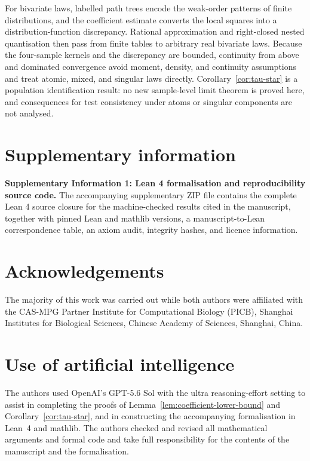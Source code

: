 \documentclass[pdflatex,sn-mathphys-num]{sn-jnl}
\theoremstyle{thmstyleone}
\begin{document}
For bivariate laws, labelled path trees encode the weak-order patterns of
finite distributions, and the coefficient estimate converts the local
squares into a distribution-function discrepancy.  Rational approximation
and right-closed nested quantisation then pass from finite tables to arbitrary
real bivariate laws.  Because the four-sample kernels and the discrepancy are
bounded, continuity from above and dominated convergence avoid moment,
density, and continuity assumptions and treat atomic, mixed, and singular
laws directly.  Corollary~\ref{cor:tau-star} is a population identification
result: no new sample-level limit theorem is proved here, and consequences for
test consistency under atoms or singular components are not analysed.

\backmatter

\section*{Supplementary information}

\textbf{Supplementary Information 1: Lean 4 formalisation and
reproducibility source code.}
The accompanying supplementary ZIP file contains the complete Lean 4 source
closure for the machine-checked results cited in the manuscript, together
with pinned Lean and mathlib versions, a manuscript-to-Lean correspondence
table, an axiom audit, integrity hashes, and licence information.

\section*{Acknowledgements}

The majority of this work was carried out while both authors were affiliated
with the CAS-MPG Partner Institute for Computational Biology (PICB), Shanghai
Institutes for Biological Sciences, Chinese Academy of Sciences, Shanghai,
China.

\section*{Use of artificial intelligence}

The authors used OpenAI's GPT-5.6 Sol with the ultra reasoning-effort
setting to assist in completing the proofs of
Lemma~\ref{lem:coefficient-lower-bound} and Corollary~\ref{cor:tau-star}, and in
constructing the accompanying formalisation in Lean~4 and mathlib.  The authors
checked and revised all mathematical arguments and formal code and take full
responsibility for the contents of the manuscript and the formalisation.
\end{document}
